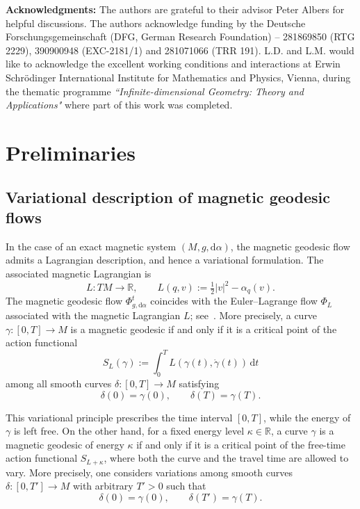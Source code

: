 \documentclass[11pt,reqno]{amsart}
\theoremstyle{plain}
\theoremstyle{definition}
\numberwithin{equation}{section}
\def\d{\delta}
\def\d{\delta}
\def\d{{\mathrm{d}}}
\begin{document}
	\noindent \textbf{Acknowledgments:}
The authors are grateful to their advisor Peter Albers for helpful discussions.
The authors acknowledge funding by the Deutsche Forschungsgemeinschaft (DFG, German Research Foundation) – 281869850 (RTG 2229), 390900948 (EXC-2181/1) and 281071066 (TRR 191).  L.D. and L.M. would like to acknowledge the excellent working
conditions and interactions at Erwin Schrödinger International
Institute for Mathematics and Physics, Vienna, during the thematic
programme \emph{``Infinite-dimensional Geometry: Theory and Applications"}
where part of this work was completed.

\section{Preliminaries}
\label{section: Preliminaries}

\subsection{Variational description of magnetic geodesic flows}\label{ss: Intermezzo magnetic systems}

In the case of an exact magnetic system \((M,g,\d\alpha)\), the magnetic
geodesic flow admits a Lagrangian description, and hence a variational
formulation. The associated magnetic Lagrangian is
\[
L \colon TM \to \mathbb{R},
\qquad
L(q,v):=\tfrac{1}{2}|v|^2-\alpha_q(v).
\]
The magnetic geodesic flow \(\Phi^t_{g,\d\alpha}\) coincides with the
Euler--Lagrange flow \(\Phi_L\) associated with the magnetic Lagrangian \(L\);
see~\cite{Gin}. More precisely, a curve \(\gamma\colon [0,T]\to M\) is a
magnetic geodesic if and only if it is a critical point of the action
functional
\[
S_L(\gamma):=\int_0^T L(\gamma(t),\dot\gamma(t))\,\d t
\]
among all smooth curves \(\delta\colon [0,T]\to M\) satisfying
\[
\delta(0)=\gamma(0),
\qquad
\delta(T)=\gamma(T).
\]

This variational principle prescribes the time interval \([0,T]\), while the
energy of \(\gamma\) is left free. On the other hand, for a fixed energy level
\(\kappa\in\mathbb{R}\), a curve \(\gamma\) is a magnetic geodesic of energy
\(\kappa\) if and only if it is a critical point of the free-time action
functional \(S_{L+\kappa}\), where both the curve and the travel time are
allowed to vary. More precisely, one considers variations among smooth curves
\(\delta\colon [0,T']\to M\) with arbitrary \(T'>0\) such that
\[
\delta(0)=\gamma(0),
\qquad
\delta(T')=\gamma(T).
\]
\end{document}
